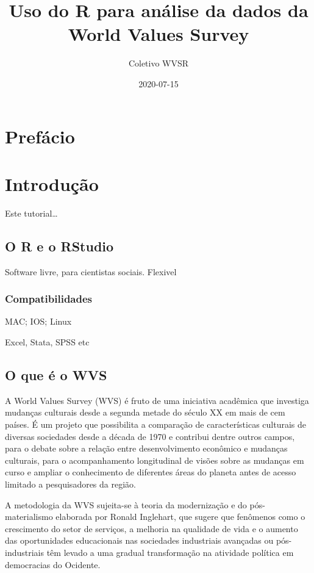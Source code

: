 \documentclass[
  brazil,
]{book}
\title{Uso do R para análise da dados da World Values Survey}
\author{Coletivo WVSR}
\date{2020-07-15}
\begin{document}
\maketitle

{
\setcounter{tocdepth}{1}
\tableofcontents
}
\hypertarget{prefuxe1cio}{%
\chapter{Prefácio}\label{prefuxe1cio}}

\hypertarget{intro}{%
\chapter{Introdução}\label{intro}}

Este tutorial\ldots{}

\hypertarget{o-r-e-o-rstudio}{%
\section{O R e o RStudio}\label{o-r-e-o-rstudio}}

Software livre, para cientistas sociais. Flexivel

\hypertarget{compatibilidades}{%
\subsection{Compatibilidades}\label{compatibilidades}}

MAC; IOS; Linux

Excel, Stata, SPSS etc

\hypertarget{o-que-uxe9-o-wvs}{%
\section{O que é o WVS}\label{o-que-uxe9-o-wvs}}

A World Values Survey (WVS) é fruto de uma iniciativa acadêmica que investiga mudanças culturais desde a segunda metade do século XX em mais de cem países. É um projeto que possibilita a comparação de características culturais de diversas sociedades desde a década de 1970 e contribui dentre outros campos, para o debate sobre a relação entre desenvolvimento econômico e mudanças culturais, para o acompanhamento longitudinal de visões sobre as mudanças em curso e ampliar o conhecimento de diferentes áreas do planeta antes de acesso limitado a pesquisadores da região.

A metodologia da WVS sujeita-se à teoria da modernização e do pós-materialismo elaborada por Ronald Inglehart, que sugere que fenômenos como o crescimento do setor de serviços, a melhoria na qualidade de vida e o aumento das oportunidades educacionais nas sociedades industriais avançadas ou pós-industriais têm levado a uma gradual transformação na atividade política em democracias do Ocidente.
\end{document}
